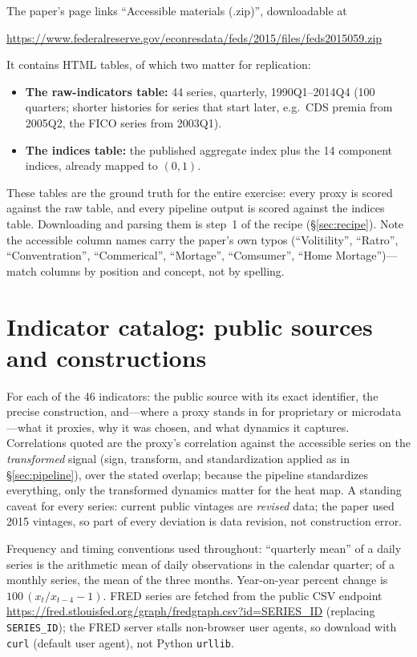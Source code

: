 \documentclass[11pt]{article}
\begin{document}
The paper's page links ``Accessible materials (.zip)'', downloadable at
\begin{center}
\url{https://www.federalreserve.gov/econresdata/feds/2015/files/feds2015059.zip}
\end{center}
It contains HTML tables, of which two matter for replication:

\begin{itemize}[nosep]
\item \textbf{The raw-indicators table:} 44 series, quarterly,
1990Q1--2014Q4 (100 quarters; shorter histories for series that start
later, e.g.\ CDS premia from 2005Q2, the FICO series from 2003Q1).
\item \textbf{The indices table:} the published aggregate index plus the
14 component indices, already mapped to $(0,1)$.
\end{itemize}

These tables are the ground truth for the entire exercise: every proxy is
scored against the raw table, and every pipeline output is scored against
the indices table.  Downloading and parsing them is step~1 of the recipe
(\S\ref{sec:recipe}).  Note the accessible column names carry the paper's
own typos (``Volitility'', ``Ratro'', ``Conventration'', ``Commerical'',
``Mortage'', ``Comsumer'', ``Home Mortage'')---match columns by position
and concept, not by spelling.

\section{Indicator catalog: public sources and constructions}
\label{sec:catalog}

For each of the 46 indicators: the public source with its exact identifier,
the precise construction, and---where a proxy stands in for proprietary or
microdata---what it proxies, why it was chosen, and what dynamics it
captures.  Correlations quoted are the proxy's correlation against the
accessible series on the \textit{transformed} signal (sign, transform, and
standardization applied as in \S\ref{sec:pipeline}), over the stated
overlap; because the pipeline standardizes everything, only the
transformed dynamics matter for the heat map.  A standing caveat for every
series: current public vintages are \textit{revised} data; the paper used
2015 vintages, so part of every deviation is data revision, not
construction error.

Frequency and timing conventions used throughout: ``quarterly mean'' of a
daily series is the arithmetic mean of daily observations in the calendar
quarter; of a monthly series, the mean of the three months.  Year-on-year
percent change is $100\,(x_t/x_{t-4}-1)$.  FRED series are fetched from the
public CSV endpoint
\url{https://fred.stlouisfed.org/graph/fredgraph.csv?id=SERIES_ID}
(replacing \texttt{SERIES\_ID}); the FRED server stalls non-browser
user agents, so download with \texttt{curl} (default user agent), not
Python \texttt{urllib}.
\end{document}
